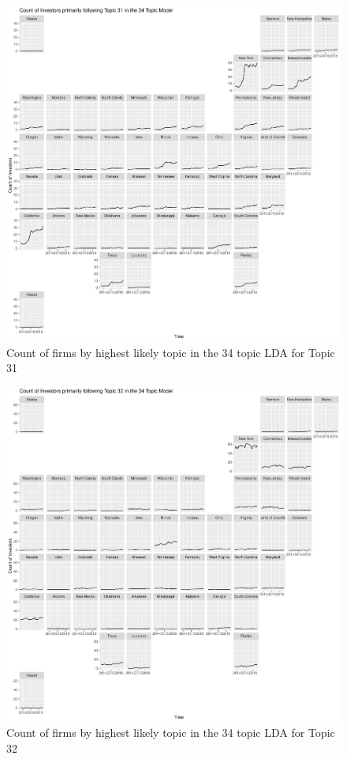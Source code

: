 \begin{figure}
	\centering
	\includegraphics[width=1\linewidth]{Figures/ChapterV/USA_34_Topic31.pdf}
	\caption[Count of Firms for Topic 31 by Quarter]{Count of firms by highest likely topic in the 34 topic LDA for Topic 31}
	\label{fig:StateLDA31}
\end{figure}

\begin{figure}
	\centering
	\includegraphics[width=1\linewidth]{Figures/ChapterV/USA_34_Topic32.pdf}
	\caption[Count of Firms for Topic 32 by Quarter]{Count of firms by highest likely topic in the 34 topic LDA for Topic 32}
	\label{fig:StateLDA32}
\end{figure}


